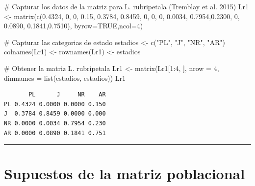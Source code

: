 \documentclass[
  12pt,
  letterpaper,
]{book}
\newenvironment{Shaded}{\begin{snugshade}}{\end{snugshade}}
\newcommand{\AttributeTok}[1]{\textcolor[rgb]{0.40,0.45,0.13}{#1}}
\newcommand{\CommentTok}[1]{\textcolor[rgb]{0.37,0.37,0.37}{#1}}
\newcommand{\ConstantTok}[1]{\textcolor[rgb]{0.56,0.35,0.01}{#1}}
\newcommand{\DecValTok}[1]{\textcolor[rgb]{0.68,0.00,0.00}{#1}}
\newcommand{\FloatTok}[1]{\textcolor[rgb]{0.68,0.00,0.00}{#1}}
\newcommand{\FunctionTok}[1]{\textcolor[rgb]{0.28,0.35,0.67}{#1}}
\newcommand{\NormalTok}[1]{\textcolor[rgb]{0.00,0.23,0.31}{#1}}
\newcommand{\OtherTok}[1]{\textcolor[rgb]{0.00,0.23,0.31}{#1}}
\newcommand{\SpecialCharTok}[1]{\textcolor[rgb]{0.37,0.37,0.37}{#1}}
\newcommand{\StringTok}[1]{\textcolor[rgb]{0.13,0.47,0.30}{#1}}
\begin{document}
\begin{Shaded}
\begin{Highlighting}[]
\CommentTok{\# Capturar los datos de la matriz para L. rubripetala (Tremblay et al. 2015)}
\NormalTok{Lr1 }\OtherTok{\textless{}{-}} \FunctionTok{matrix}\NormalTok{(}\FunctionTok{c}\NormalTok{(}\FloatTok{0.4324}\NormalTok{, }\DecValTok{0}\NormalTok{,      }\DecValTok{0}\NormalTok{,     }\FloatTok{0.15}\NormalTok{,}
                \FloatTok{0.3784}\NormalTok{, }\FloatTok{0.8459}\NormalTok{, }\DecValTok{0}\NormalTok{,     }\DecValTok{0}\NormalTok{,}
                \DecValTok{0}\NormalTok{,      }\FloatTok{0.0034}\NormalTok{, }\FloatTok{0.7954}\NormalTok{,}\FloatTok{0.2300}\NormalTok{,}
                \DecValTok{0}\NormalTok{,      }\FloatTok{0.0890}\NormalTok{, }\FloatTok{0.1841}\NormalTok{,}\FloatTok{0.7510}\NormalTok{), }\AttributeTok{byrow=}\ConstantTok{TRUE}\NormalTok{,}\AttributeTok{ncol=}\DecValTok{4}\NormalTok{)}

\CommentTok{\# Capturar las categorias de estado}
\NormalTok{estadios }\OtherTok{\textless{}{-}} \FunctionTok{c}\NormalTok{(}\StringTok{"PL"}\NormalTok{, }\StringTok{"J"}\NormalTok{, }\StringTok{"NR"}\NormalTok{, }\StringTok{"AR"}\NormalTok{)}
\FunctionTok{colnames}\NormalTok{(Lr1) }\OtherTok{\textless{}{-}} \FunctionTok{rownames}\NormalTok{(Lr1) }\OtherTok{\textless{}{-}}\NormalTok{ estadios}

\CommentTok{\# Obtener la matriz L. rubripetala}
\NormalTok{Lr1 }\OtherTok{\textless{}{-}} \FunctionTok{matrix}\NormalTok{(Lr1[}\DecValTok{1}\SpecialCharTok{:}\DecValTok{4}\NormalTok{, ], }\AttributeTok{nrow =} \DecValTok{4}\NormalTok{, }\AttributeTok{dimnames =} \FunctionTok{list}\NormalTok{(estadios, estadios))}
\NormalTok{Lr1}
\end{Highlighting}
\end{Shaded}

\begin{verbatim}
       PL      J     NR    AR
PL 0.4324 0.0000 0.0000 0.150
J  0.3784 0.8459 0.0000 0.000
NR 0.0000 0.0034 0.7954 0.230
AR 0.0000 0.0890 0.1841 0.751
\end{verbatim}

\begin{center}\rule{0.5\linewidth}{0.5pt}\end{center}

\section{Supuestos de la matriz
poblacional}\label{supuestos-de-la-matriz-poblacional}
\end{document}
